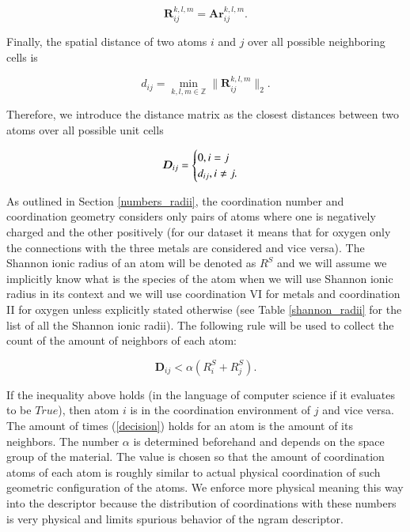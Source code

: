 \documentclass[11pt,oneside,czech,american]{book} %
\theoremstyle{definition} %
\theoremstyle{definition}
\begin{document}
\begin{equation}
	\bm{R}^{k,l,m}_{ij} = \bm{A} \bm{r}^{k,l,m}_{ij}.
\end{equation}

Finally, the spatial distance of two atoms $i$ and $j$ over all possible neighboring cells is

\begin{equation}
	d_{ij} = \min_{k,l,m \in \mathbb{Z}}{\|\bm{R}^{k,l,m}_{ij}\|_2}.
\end{equation}

Therefore, we introduce the distance matrix as the closest distances between two atoms over all possible unit cells

\begin{equation}
	\bm{D}_{ij} = 
	\begin{cases}
		0,\space i = j \\
		d_{ij}, \space i \neq j.
	\end{cases}
\end{equation}

As outlined in Section \ref{numbers_radii}, the coordination number and coordination geometry considers only pairs of atoms where one is negatively charged and the other positively (for our dataset it means that for oxygen only the connections with the three metals are considered and vice versa). The Shannon ionic radius of an atom will be denoted as $R^S$ and we will assume we implicitly know what is the species of the atom when we will use Shannon ionic radius in its context and we will use coordination VI for metals and coordination II for oxygen unless explicitly stated otherwise (see Table \ref{shannon_radii} for the list of all the Shannon ionic radii). The following rule will be used to collect the count of the amount of neighbors of each atom:

\begin{equation}
	\bm{D}_{ij} < \alpha (R^{S}_i + R^{S}_j).
	\label{decision}
\end{equation}

If the inequality above holds (in the language of computer science if it evaluates to be $True$), then atom $i$ is in the coordination environment of $j$ and vice versa. The amount of times (\ref{decision}) holds for an atom is the amount of its neighbors. The number $\alpha$ is determined beforehand and depends on the space group of the material. The value is chosen so that the amount of coordination atoms of each atom is roughly similar to actual physical coordination of such geometric configuration of the atoms. We enforce more physical meaning this way into the descriptor because the distribution of coordinations with these numbers is very physical and limits spurious behavior of the ngram descriptor.
\end{document}

